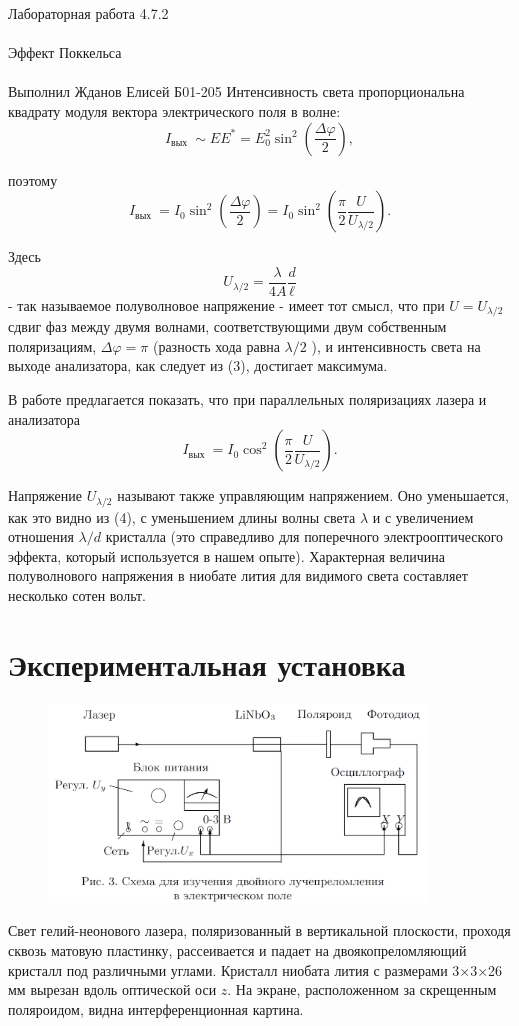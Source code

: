 \documentclass{astroedu-lab}
\begin{document}
\begin{problem}{\huge Лабораторная работа 4.7.2\\\\Эффект Поккельса\\\\Выполнил Жданов Елисей Б01-205}
Интенсивность света пропорциональна квадрату модуля вектора электрического поля в волне:
$$
I_{\text {вых }} \sim E E^*=E_0^2 \sin ^2\left(\frac{\Delta \varphi}{2}\right),
$$

поэтому
$$
I_{\text {вых }}=I_0 \sin ^2\left(\frac{\Delta \varphi}{2}\right)=I_0 \sin ^2\left(\frac{\pi}{2} \frac{U}{U_{\lambda / 2}}\right) .
$$

Здесь
$$
U_{\lambda / 2}=\frac{\lambda}{4 A} \frac{d}{\ell}
$$
- так называемое полуволновое напряжение - имеет тот смысл, что при $U=U_{\lambda / 2}$ сдвиг фаз между двумя волнами, соответствующими двум собственным поляризациям, $\Delta \varphi=\pi$ (разность хода равна $\lambda / 2$ ), и интенсивность света на выходе анализатора, как следует из (3), достигает максимума.

В работе предлагается показать, что при параллельных поляризациях лазера и анализатора
$$
I_{\text {вых }}=I_0 \cos ^2\left(\frac{\pi}{2} \frac{U}{U_{\lambda / 2}}\right) .
$$

Напряжение $U_{\lambda / 2}$ называют также управляющим напряжением. Оно уменьшается, как это видно из (4), с уменьшением длины волны света $\lambda$ и с увеличением отношения $\lambda / d$ кристалла (это справедливо для поперечного электрооптического эффекта, который используется в нашем опыте). Характерная величина полуволнового напряжения в ниобате лития для видимого света составляет несколько сотен вольт.

\section{Экспериментальная установка}

\begin{figure}[!h]
	\centering
	\includegraphics[width=0.9\textwidth]{установка.png}
	\label{fig:boiler}
\end{figure}

Свет гелий-неонового лазера, поляризованный в вертикальной плоскости, проходя сквозь матовую пластинку, рассеивается и падает на двоякопреломляющий кристалл под различными углами. Кристалл ниобата лития с размерами 3×3×26 мм вырезан вдоль оптической оси $z$. На экране, расположенном за скрещенным поляроидом, видна интерференционная картина.


\end{problem}
\end{document}

